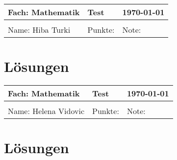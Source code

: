 \documentclass{article}%
\begin{document}
%
\begin{tabular}{|p{5cm}|p{5cm}|p{5cm}|}%
\hline%
Fach: Mathematik&Test&\today\\%
\hline%
&&\\%
Name: Hiba Turki&Punkte: &Note: \\%
\hline%
\end{tabular}%
%
\section*{Lösungen}%
%
\newpage

%
\begin{tabular}{|p{5cm}|p{5cm}|p{5cm}|}%
\hline%
Fach: Mathematik&Test&\today\\%
\hline%
&&\\%
Name: Helena Vidovic&Punkte: &Note: \\%
\hline%
\end{tabular}%
%
\section*{Lösungen}%
%
\newpage

%
\end{document}
